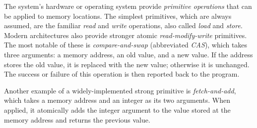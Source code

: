 The system's hardware or operating system provide \emph{primitive operations} that can be applied to memory locations. The simplest primitives, which are always assumed,
are the familiar \emph{read} and \emph{write} operations,
also called \emph{load} and \emph{store}.
Modern architectures also provide stronger atomic \emph{read-modify-write} primitives. The most notable of these is \emph{compare-and-swap} (abbreviated \textit{CAS}), which takes three arguments: a memory address, an old value, and a new value. If the address stores the old value, it is replaced with the new value; otherwise it is unchanged. The success or failure of this operation is then reported back to the program.
%
%

Another example of a widely-implemented strong primitive is \emph{fetch-and-add}, which takes a memory address and an integer as its two arguments. When applied, it atomically adds the integer argument to the value stored at the memory address and returns the previous value.

